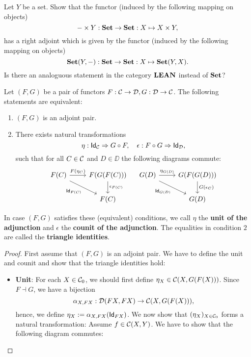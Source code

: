 \begin{exer}\label{exer:adjunction_homtensor_currying} Let $Y$ be a set. Show that the functor (induced by the following mapping on objects)
\[
- \times Y : \SET\to \SET: X\mapsto X\times Y,
\]
has a right adjoint which is given by the functor (induced by the following mapping on objects)
\[
\CHom{\SET}{Y}{-} : \SET\to\SET : X\mapsto \CHom{\SET}{Y}{X}.
\]
Is there an analoguous statement in the category $\LEAN$ instead of $\SET$?
\end{exer}

\begin{thm} Let $(F,G)$ be a pair of functors $F : \CC\to\DD, G: \DD\to\CC$. The following statements are equivalent:
\begin{enumerate}
\item $(F,G)$ is an adjoint pair.
\item There exists natural transformations 
\[
\NatTrans{\eta}{\Id[\CC]}{\co{F}{G}}, \quad \NatTrans{\epsilon}{\co{G}{F}}{\Id[\DD]},
\]
such that for all $C\in\CC$ and $D\in\DD$ the following diagrams commute:
\[
\begin{tikzcd}
F(C) \arrow[r,"{F(\eta_C)}"] \arrow[rd,swap, "{\Id[F(C)]}"] & F(G(F(C))) \arrow[d, "{\epsilon_{F(C)}}"] \\
& F(C)
\end{tikzcd} \quad 
\begin{tikzcd}
G(D) \arrow[r,"{\eta_{G(D)}}"] \arrow[rd,swap, "{\Id[G(D)]}"] & G(F(G(D))) \arrow[d, "{G(\epsilon_{C})}"] \\
& G(D)
\end{tikzcd}
\]
\end{enumerate}
In case $(F,G)$ satisfies these (equivalent) conditions, we call $\eta$ the \textbf{unit of the adjunction} and $\epsilon$ the \textbf{counit of the adjunction}. The equalities in condition $2$ are called the \textbf{triangle identities}.
\begin{proof}
First assume that $(F,G)$ is an adjoint pair. We have to define the unit and counit and show that the triangle identities hold:
\begin{itemize}
\item \textbf{Unit}: For each $X\in\Ob{\CC}$, we should first define $\eta_X \in \CHom{\CC}{X}{G(F(X))}$. Since $F \dashv G$, we have a bijection
\[
\alpha_{X,FX} : \CHom{\DD}{FX}{FX} \to \CHom{\CC}{X}{G(F(X))},
\]
hence, we define $\eta_X := \alpha_{X,FX}(\Id[FX])$. We now show that $(\eta_X)_{X\in\Ob{\CC}}$ forms a natural transformation: Assume $f\in\CHom{\CC}{X}{Y}$. We have to show that the following diagram commutes:

\end{itemize}
\end{proof}
\end{thm}
